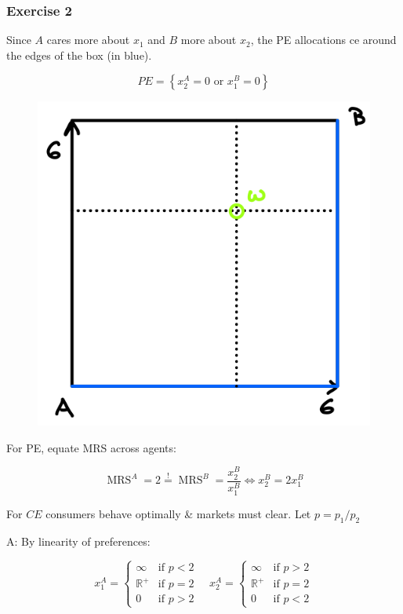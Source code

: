 {
\subsubsection*{Exercise 2}

\begin{enumerate}[label=(\alph*)]
{\item
Since $A$ cares more about $x_{1}$ and $B$ more about $x_{2}$, the PE allocations ce around the edges of the box (in blue).

$$
P E=\left\{x_{2}^{A}=0 \text{ or } x_{1}^{B}=0\right\}
$$

\begin{figure}[!h]
    \centering
    \includegraphics[width=.5\textwidth]{images/2015_16_2.png}
\end{figure}
}
{\item
For PE, equate MRS across agents:

$$
\operatorname{MRS}^{A}=2 \stackrel{!}{=} \operatorname{MRS}^{B}=\frac{x_{2}^{B}}{x_{1}^{B}} \Leftrightarrow x_{2}^{B}=2 x_{1}^{B}
$$

For $C E$ consumers behave optimally \& markets must clear. Let $p=p_{1} / p_{2}$

A: By linearity of preferences:

$$
x_{1}^{A}=\left\{\begin{array}{lll}
    \infty & \text {if } p<2 \\
    \mathbb{R}^{+} & \text {if } p=2 \\
    0 & \text {if } p>2
\end{array} \quad x_{2}^{A}=\left\{\begin{array}{lll}
    \infty & \text {if } p>2 \\
    \mathbb{R}^{+} & \text {if } p=2 \\
    0 & \text {if } p<2
\end{array}\right.\right.
$$

}
\end{enumerate}}
